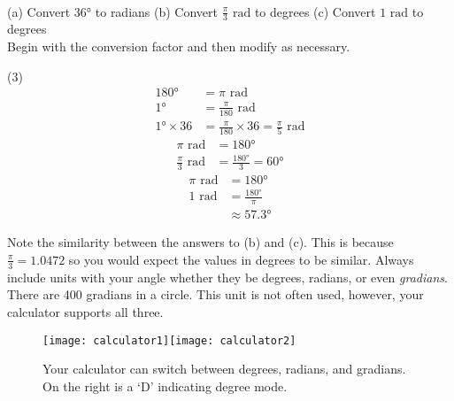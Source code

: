 \example\medskip\\
(a) Convert \ang{36} to radians\hspace{0.7cm} 
(b) Convert $\displaystyle\frac{\pi }{3}$ $\mbox{rad}$ to degrees \hspace{0.7cm} 
(c) Convert $1$ $\mbox{rad}$ to degrees \medskip\\

\solution Begin with the conversion factor and then modify as necessary.
\begin{tasks}[before-skip = {0ex} , after-skip={-5ex}](3)
\task \begin{align*}\ang{180}  &  =  \pi \text{ rad} \\
\ang{1}  &  =  \frac{\pi }{180}\text{ rad} \\
\ang{1} \times 36 &  =  \frac{\pi }{180} \times 36 =\frac{\pi }{5}\text{ rad}\end{align*}
\task
\begin{align*}\pi  \text{ rad} &  =  \ang{180}  \\
\frac{\pi }{3} \text{ rad} &  = \frac{\ang{180} }{3} =\ang{60} \end{align*}
\task
\begin{align*}\pi  \text{ rad} &  =  \ang{180} \\
1 \text{ rad} &  =  \frac{\ang{180} }{\pi } \\
 &  \approx   \ang{57.3} \end{align*}
\end{tasks}
Note the similarity between the answers to (b) and (c). This is because $\frac{\pi }{3} =1.0472$ so you would expect the values in degrees to be similar. Always include units with your angle whether they be degrees, radians, or even \textit{gradians}. There are 400 gradians in a circle. This unit is not often used, however, your calculator supports all three.\\
\begin{figure}[h]
\begin{center}\texttt{[image: calculator1]}\hspace{1cm}\texttt{[image: calculator2]}\end{center}
\caption{Your calculator can switch between degrees, radians, and gradians. On the right is a `D' indicating degree mode.}
\end{figure}

